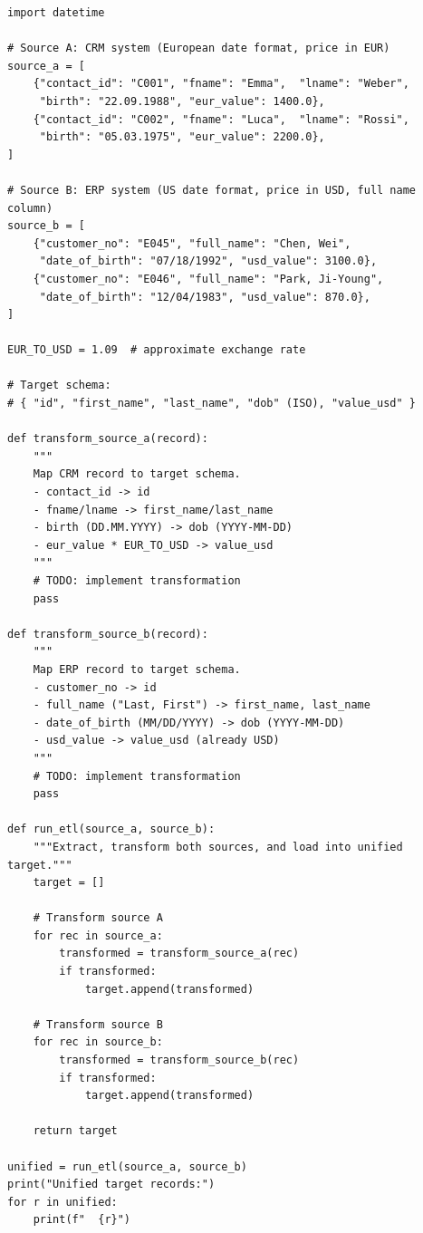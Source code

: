 \begin{lstlisting}[style=pyspark, caption={PE2.3: ETL pipeline simulation}]
import datetime

# Source A: CRM system (European date format, price in EUR)
source_a = [
    {"contact_id": "C001", "fname": "Emma",  "lname": "Weber",
     "birth": "22.09.1988", "eur_value": 1400.0},
    {"contact_id": "C002", "fname": "Luca",  "lname": "Rossi",
     "birth": "05.03.1975", "eur_value": 2200.0},
]

# Source B: ERP system (US date format, price in USD, full name column)
source_b = [
    {"customer_no": "E045", "full_name": "Chen, Wei",
     "date_of_birth": "07/18/1992", "usd_value": 3100.0},
    {"customer_no": "E046", "full_name": "Park, Ji-Young",
     "date_of_birth": "12/04/1983", "usd_value": 870.0},
]

EUR_TO_USD = 1.09  # approximate exchange rate

# Target schema:
# { "id", "first_name", "last_name", "dob" (ISO), "value_usd" }

def transform_source_a(record):
    """
    Map CRM record to target schema.
    - contact_id -> id
    - fname/lname -> first_name/last_name
    - birth (DD.MM.YYYY) -> dob (YYYY-MM-DD)
    - eur_value * EUR_TO_USD -> value_usd
    """
    # TODO: implement transformation
    pass

def transform_source_b(record):
    """
    Map ERP record to target schema.
    - customer_no -> id
    - full_name ("Last, First") -> first_name, last_name
    - date_of_birth (MM/DD/YYYY) -> dob (YYYY-MM-DD)
    - usd_value -> value_usd (already USD)
    """
    # TODO: implement transformation
    pass

def run_etl(source_a, source_b):
    """Extract, transform both sources, and load into unified target."""
    target = []

    # Transform source A
    for rec in source_a:
        transformed = transform_source_a(rec)
        if transformed:
            target.append(transformed)

    # Transform source B
    for rec in source_b:
        transformed = transform_source_b(rec)
        if transformed:
            target.append(transformed)

    return target

unified = run_etl(source_a, source_b)
print("Unified target records:")
for r in unified:
    print(f"  {r}")
\end{lstlisting}

